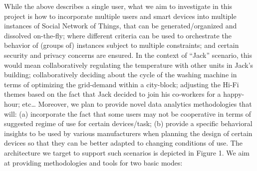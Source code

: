 While the above describes a single user, what we aim to investigate in this project is how to incorporate multiple users and smart devices into multiple instances of Social Network of Things, that can be generated/organized and dissolved on-the-fly; where different criteria can be used to orchestrate the behavior of (groups of) instances subject to multiple constraints; and certain security and privacy concerns are ensured. In the context of “Jack” scenario, this would mean collaboratively regulating the temperature with other units in Jack’s building; collaboratively deciding about the cycle of the washing machine in terms of optimizing the grid-demand within a city-block; adjusting the Hi-Fi themes based on the fact that Jack decided to join his co-workers for a happy-hour; etc… Moreover, we plan to provide novel data analytics methodologies that will: (a) incorporate the fact that some users may not be cooperative in terms of suggested regime of use for certain devices/task; (b) provide a specific behavioral insights to be used by various manufacturers when planning the design of certain devices so that they can be better adapted to changing conditions of use. 
The architecture we target to support such  scenarios is depicted in Figure 1. We aim at providing methodologies and tools for two basic modes: 

